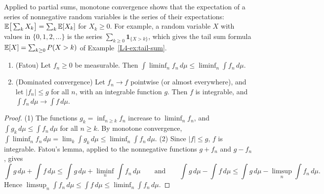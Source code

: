 Applied to partial sums, monotone convergence shows that the expectation of a series of nonnegative random variables is the series of their expectations: $\mathbb{E}\big[\sum_k X_k\big] = \sum_k \mathbb{E}[X_k]$ for $X_k \geq 0$. For example, a random variable $X$ with values in $\{0, 1, 2, \ldots\}$ is the series $\sum_{k \geq 0} \mathbf{1}_{\{X > k\}}$, which gives the tail sum formula $\mathbb{E}[X] = \sum_{k \geq 0} P(X > k)$ of Example~\ref{L4-ex:tail-sum}.

\begin{theorem}\label{B-thm:dominated}
    \begin{enumerate}
        \item (Fatou) Let $f_n \geq 0$ be measurable. Then $\int \liminf_n f_n\, d\mu \leq \liminf_n \int f_n\, d\mu$.
        \item (Dominated convergence) Let $f_n \to f$ pointwise (or almost everywhere), and let $|f_n| \leq g$ for all $n$, with an integrable function $g$. Then $f$ is integrable, and $\int f_n\, d\mu \to \int f\, d\mu$.
    \end{enumerate}
\end{theorem}

\begin{proof}
    (1) The functions $g_k = \inf_{n \geq k} f_n$ increase to $\liminf_n f_n$, and $\int g_k\, d\mu \leq \int f_n\, d\mu$ for all $n \geq k$. By monotone convergence, $\int \liminf_n f_n\, d\mu = \lim_k \int g_k\, d\mu \leq \liminf_n \int f_n\, d\mu$. (2) Since $|f| \leq g$, $f$ is integrable. Fatou's lemma, applied to the nonnegative functions $g + f_n$ and $g - f_n$, gives
    \[\int g\, d\mu + \int f\, d\mu \leq \int g\, d\mu + \liminf_n \int f_n\, d\mu \qquad \text{and} \qquad \int g\, d\mu - \int f\, d\mu \leq \int g\, d\mu - \limsup_n \int f_n\, d\mu.\]
    Hence $\limsup_n \int f_n\, d\mu \leq \int f\, d\mu \leq \liminf_n \int f_n\, d\mu$.
\end{proof}


